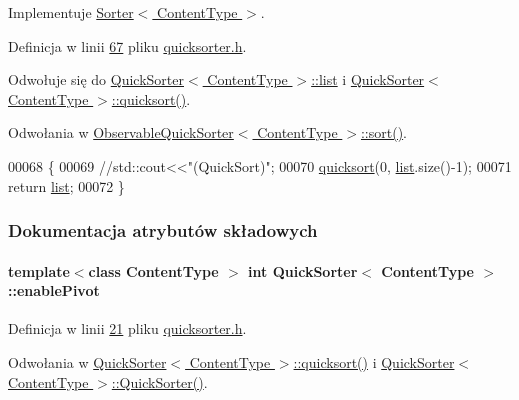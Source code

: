 Implementuje \hyperlink{class_sorter_a880cfd8969b78557ed207ad6f2bd4819}{Sorter$<$ Content\-Type $>$}.



Definicja w linii \hyperlink{quicksorter_8h_source_l00067}{67} pliku \hyperlink{quicksorter_8h_source}{quicksorter.\-h}.



Odwołuje się do \hyperlink{quicksorter_8h_source_l00023}{Quick\-Sorter$<$ Content\-Type $>$\-::list} i \hyperlink{quicksorter_8h_source_l00042}{Quick\-Sorter$<$ Content\-Type $>$\-::quicksort()}.



Odwołania w \hyperlink{observablequicksorter_8h_source_l00026}{Observable\-Quick\-Sorter$<$ Content\-Type $>$\-::sort()}.


\begin{DoxyCode}
00068         \{
00069                 \textcolor{comment}{//std::cout<<"(QuickSort)";}
00070                 \hyperlink{class_quick_sorter_a99641193667f65f8a203b65fdc0b4d92}{quicksort}(0, \hyperlink{class_quick_sorter_a66cd768b6d8a77952f004be7aad87a0e}{list}.size()-1);
00071                 \textcolor{keywordflow}{return} \hyperlink{class_quick_sorter_a66cd768b6d8a77952f004be7aad87a0e}{list};
00072         \}
\end{DoxyCode}


\subsubsection{Dokumentacja atrybutów składowych}
\hypertarget{class_quick_sorter_a8c3f6118075353547d6fc5da57e2267e}{
\paragraph[{enable\-Pivot}]{\setlength{\rightskip}{0pt plus 5cm}template$<$class Content\-Type $>$ int {\bf Quick\-Sorter}$<$ Content\-Type $>$\-::enable\-Pivot}}\label{class_quick_sorter_a8c3f6118075353547d6fc5da57e2267e}


Definicja w linii \hyperlink{quicksorter_8h_source_l00021}{21} pliku \hyperlink{quicksorter_8h_source}{quicksorter.\-h}.



Odwołania w \hyperlink{quicksorter_8h_source_l00042}{Quick\-Sorter$<$ Content\-Type $>$\-::quicksort()} i \hyperlink{quicksorter_8h_source_l00028}{Quick\-Sorter$<$ Content\-Type $>$\-::\-Quick\-Sorter()}.

